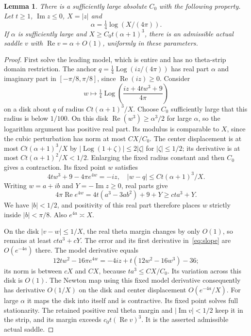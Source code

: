 \documentclass[11pt]{article}
\newtheorem{lemma}[theorem]{Lemma}
\theoremstyle{remark}\newtheorem{remark}[theorem]{Remark}
\DeclareMathOperator{\Rea}{Re}\DeclareMathOperator{\Ima}{Im}
\DeclareMathOperator{\Log}{Log}
\begin{document}
\begin{lemma}\label{lem:farsaddle}
There is a sufficiently large absolute $C_0$ with the following
property. Let $t\geq1$, $\Ima z\leq0$, $X=|z|$ and
\[
 \alpha=\tfrac14\log(X/(4\pi)).
\]
If $\alpha$ is sufficiently large and
$X\geq C_0t(\alpha+1)^3$, there is an admissible actual saddle
$v$ with $\Rea v=\alpha+O(1)$, uniformly in these parameters.
\end{lemma}
\begin{proof}
First solve the leading model, which is entire and has no
theta-strip domain restriction. The anchor
$q=\tfrac14\Log(iz/(4\pi))$ has real part $\alpha$ and
imaginary part in $[-\pi/8,\pi/8]$, since $\Rea(iz)\geq0$.
Consider
\[
 w\longmapsto\tfrac14\Log\left(\frac{iz+4tw^3+9}{4\pi}\right)
\]
on a disk about $q$ of radius $Ct(\alpha+1)^3/X$.
Choose $C_0$ sufficiently large that this radius is below
$1/100$. On this disk $\Rea(w^3)\geq\alpha^3/2$ for large
$\alpha$, so the logarithm argument has positive real part.
Its modulus is comparable to $X$, since the cubic perturbation
has norm at most $CX/C_0$.
The center displacement is at most $Ct(\alpha+1)^3/X$ by
$|\Log(1+\zeta)|\leq2|\zeta|$ for $|\zeta|\leq1/2$;
its derivative is at most $Ct(\alpha+1)^2/X<1/2$.
Enlarging the fixed radius constant and then $C_0$ gives a
contraction. Its fixed point $w$ satisfies
\[
 4tw^3+9-4\pi e^{4w}=-iz,\quad
 |w-q|\leq Ct(\alpha+1)^3/X.
\]
Writing $w=a+ib$ and $Y=-\Ima z\geq0$, real parts give
\[
 4\pi\Rea e^{4w}=4t(a^3-3ab^2)+9+Y\geq cta^3+Y.
\]
We have $|b|<1/2$, and positivity of this real part therefore
places $w$ strictly inside $|b|<\pi/8$.
Also $e^{4a}\asymp X$.

On the disk $|v-w|\leq1/X$, the real theta margin changes
by only $O(1)$, so remains at least $cta^3+ cY$.
The error and its first derivative in~\eqref{eq:slope} are
$O(e^{-4a})$ there. The model derivative equals
\[
 12tw^2-16\pi e^{4w}
        =-4iz+t(12w^2-16w^3)-36;
\]
its norm is between $cX$ and $CX$, because
$ta^3\leq CX/C_0$. Its variation across this disk is $O(1)$.
The Newton map using this fixed model derivative consequently
has derivative $O(1/X)$ on the disk and center displacement
$O(e^{-4a}/X)$. For large $\alpha$ it maps the disk into itself
and is contractive. Its fixed point solves full stationarity.
The retained positive real theta margin and $|\Ima v|<1/2$
keep it in the strip, and its margin exceeds
$c_0t(\Rea v)^3$. It is the asserted admissible actual saddle.
\end{proof}
\end{document}
